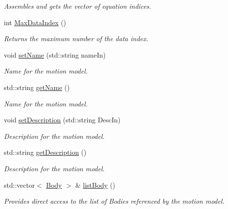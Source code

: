 \begin{DoxyCompactItemize}
\begin{DoxyCompactList}\small\item\em Assembles and gets the vector of equation indices. \end{DoxyCompactList}\item 
int \hyperlink{classosea_1_1ofreq_1_1_motion_model_a81ed21162a09ffce06043f3a7fb4213d}{Max\-Data\-Index} ()
\begin{DoxyCompactList}\small\item\em Returns the maximum number of the data index. \end{DoxyCompactList}\item 
void \hyperlink{classosea_1_1ofreq_1_1_motion_model_a42d989727028c18c59ba04f958bc7b74}{set\-Name} (std\-::string name\-In)
\begin{DoxyCompactList}\small\item\em Name for the motion model. \end{DoxyCompactList}\item 
std\-::string \hyperlink{classosea_1_1ofreq_1_1_motion_model_af9fd1e58735b7f47bc5d5257bdca9139}{get\-Name} ()
\begin{DoxyCompactList}\small\item\em Name for the motion model. \end{DoxyCompactList}\item 
void \hyperlink{classosea_1_1ofreq_1_1_motion_model_a5097540bb98ad753594d41890e6ef30d}{set\-Description} (std\-::string Desc\-In)
\begin{DoxyCompactList}\small\item\em Description for the motion model. \end{DoxyCompactList}\item 
std\-::string \hyperlink{classosea_1_1ofreq_1_1_motion_model_a8594356137407b25d03927a68a422dc9}{get\-Description} ()
\begin{DoxyCompactList}\small\item\em Description for the motion model. \end{DoxyCompactList}\item 
std\-::vector$<$ \hyperlink{classosea_1_1ofreq_1_1_body}{Body} $>$ \& \hyperlink{classosea_1_1ofreq_1_1_motion_model_a67ad0e6b993a20af61170cdebe8f418f}{list\-Body} ()
\begin{DoxyCompactList}\small\item\em Provides direct access to the list of Bodies referenced by the motion model. \end{DoxyCompactList}\item 

\end{DoxyCompactItemize}
